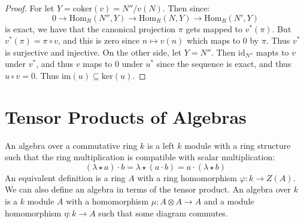 \documentclass[crop=false,class=article]{standalone}                           %
\begin{document}
        \begin{proof}
            For let $Y=\textrm{coker}(v)=N''/v(N)$. Then since:
            \begin{equation}
                0\rightarrow\textrm{Hom}_{R}(N'',Y)
                \rightarrow\textrm{Hom}_{R}(N,Y)
                \rightarrow\textrm{Hom}_{R}(N',Y)
            \end{equation}
            is exact, we have that the canonical projection $\pi$ gets mapped
            to $v^{*}(\pi)$. But $v^{*}(\pi)=\pi\circ{v}$, and this is zero
            since $n\mapsto{v}(n)$ which maps to $0$ by $\pi$. Thus $v^{*}$ is
            surjective and injective. On the other side, let $Y=N''$. Then
            $\textrm{id}_{N''}$ mapts to $v$ under $v^{*}$, and thus
            $v$ maps to $0$ under $u^{*}$ since the sequence is exact, and
            thus $u\circ{v}=0$. Thus $\textrm{im}(u)\subseteq\textrm{ker}(u)$.
        \end{proof}
    \section{Tensor Products of Algebras}
        An algebra over a commutative ring $k$ is a left $k$ module with a ring
        structure such that the ring multiplication is compatible with scalar
        multiplication:
        \begin{equation}
            (\lambda\star{a})\cdot{b}=\lambda\star(a\cdot{b})
                =a\cdot(\lambda\star{b})
        \end{equation}
        An equivalent definition is a ring $A$ with a ring homomorphism
        $\varphi:k\rightarrow{Z}(A)$. We can also define an algebra in terms of
        the tensor product. An algebra over $k$ is a $k$ module $A$ with a
        homomorphism $\mu:A\otimes{A}\rightarrow{A}$ and a module homomorphism
        $\eta:k\rightarrow{A}$ such that some diagram commutes.
\end{document}
